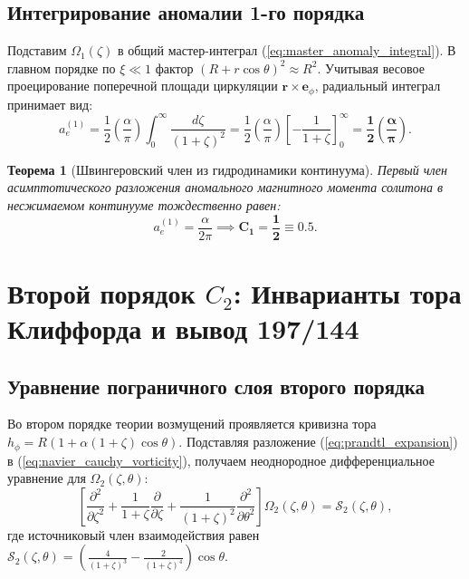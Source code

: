 \documentclass[12pt,a4paper]{article}
\newtheorem{theorem}{Теорема}
\begin{document}
	\subsection{Интегрирование аномалии 1-го порядка}
	Подставим $\Omega_1(\zeta)$ в общий мастер-интеграл (\ref{eq:master_anomaly_integral}). В главном порядке по $\xi \ll 1$ фактор $(R + r\cos\theta)^2 \approx R^2$. Учитывая весовое проецирование поперечной площади циркуляции $\mathbf{r} \times \mathbf{e}_\phi$, радиальный интеграл принимает вид:
	\begin{equation}
		a_e^{(1)} = \frac{1}{2} \left(\frac{\alpha}{\pi}\right) \int_0^\infty \frac{d\zeta}{(1+\zeta)^2} = \frac{1}{2} \left(\frac{\alpha}{\pi}\right) \left[ -\frac{1}{1+\zeta} \right]_0^\infty = \mathbf{\frac{1}{2} \left(\frac{\alpha}{\pi}\right)}.
	\end{equation}
	
	\begin{theorem}[Швингеровский член из гидродинамики континуума]
		Первый член асимптотического разложения аномального магнитного момента солитона в несжимаемом континууме тождественно равен:
		\begin{equation}
			a_e^{(1)} = \frac{\alpha}{2\pi} \implies \mathbf{C_1 = \frac{1}{2} \equiv 0.5}.
		\end{equation}
	\end{theorem}
	
	\section{Второй порядок $C_2$: Инварианты тора Клиффорда и вывод 197/144}
	
	\subsection{Уравнение пограничного слоя второго порядка}
	Во втором порядке теории возмущений проявляется кривизна тора $h_\phi = R(1 + \alpha(1+\zeta)\cos\theta)$. Подставляя разложение (\ref{eq:prandtl_expansion}) в (\ref{eq:navier_cauchy_vorticity}), получаем неоднородное дифференциальное уравнение для $\Omega_2(\zeta, \theta)$:
	\begin{equation}
		\left[ \frac{\partial^2}{\partial \zeta^2} + \frac{1}{1+\zeta}\frac{\partial}{\partial \zeta} + \frac{1}{(1+\zeta)^2}\frac{\partial^2}{\partial \theta^2} \right] \Omega_2(\zeta, \theta) = \mathcal{S}_2(\zeta, \theta),
		\label{eq:second_order_pde}
	\end{equation}
	где источниковый член взаимодействия равен $\mathcal{S}_2(\zeta, \theta) = \left( \frac{4}{(1+\zeta)^3} - \frac{2}{(1+\zeta)^4} \right) \cos\theta$.
	
\end{document}
